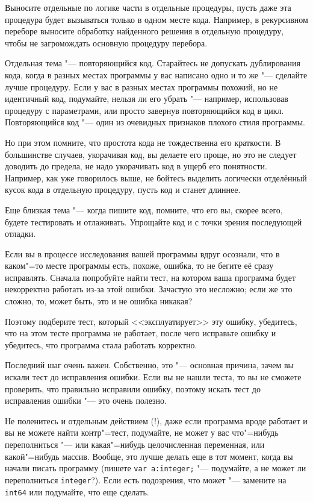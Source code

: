 \documentclass[a4paper,10pt]{problems}
\begin{document}
Выносите отдельные по логике части в отдельные процедуры, пусть даже эта процедура будет вызываться только в одном месте кода. 
Например, в рекурсивном переборе выносите обработку найденного решения в отдельную процедуру, чтобы не загромождать основную процедуру перебора.

Отдельная тема "--- повторяющийся код. 
Старайтесь не допускать дублирования кода, когда в разных местах программы у вас написано одно и то же "--- сделайте лучше процедуру.
Если у вас в разных местах программы похожий, но не идентичный код, подумайте, нельзя ли его убрать "--- например, использовав процедуру с параметрами,
или просто завернув повторяющийся код в цикл. 
Повторяющийся код "--- один из очевидных признаков плохого стиля программы.

Но при этом помните, что простота кода не тождественна его краткости. 
В большинстве случаев, укорачивая код, вы делаете его проще, но это не следует доводить до предела, не надо укорачивать код в ущерб его понятности.
Например, как уже говорилось выше, не бойтесь выделить логически отделённый кусок кода в отдельную процедуру, пусть код и станет длиннее.

Еще близкая тема "--- когда пишите код, помните, что его вы, скорее всего, будете тестировать и отлаживать. 
Упрощайте код и с точки зрения последующей отладки.

Если вы в процессе исследования вашей программы вдруг осознали, что в каком"=то месте программы есть, похоже, ошибка, то не бегите её сразу исправлять.
Сначала попробуйте найти тест, на котором ваша программа будет некорректно работать из-за этой ошибки.
Зачастую это несложно; если же это сложно, то, может быть, это и не ошибка никакая? 

Поэтому подберите тест, который <<эксплуатирует>> эту ошибку, убедитесь, что на этом тесте программа не работает, после чего исправьте ошибку и убедитесь,
что программа стала работать корректно.

Последний шаг очень важен. Собственно, это "--- основная причина, зачем вы искали тест до исправления ошибки. 
Если вы не нашли теста, то вы не сможете проверить, что правильно исправили ошибку, поэтому искать тест до исправления ошибки "--- это очень полезно.

Не поленитесь и отдельным действием (!), даже если программа вроде работает и вы не можете найти контр"=тест, подумайте,
не может у вас что"=нибудь переполниться "--- или какая"=нибудь целочисленная переменная, или какой"=нибудь массив. 
Вообще, это лучше делать еще в тот момент, когда вы начали писать программу (пишете \verb`var a:integer;` "--- подумайте, а не может ли переполниться
\verb`integer`?). Если есть подозрения, что может "--- замените на \verb`int64` или подумайте, что еще сделать.
\end{document}
